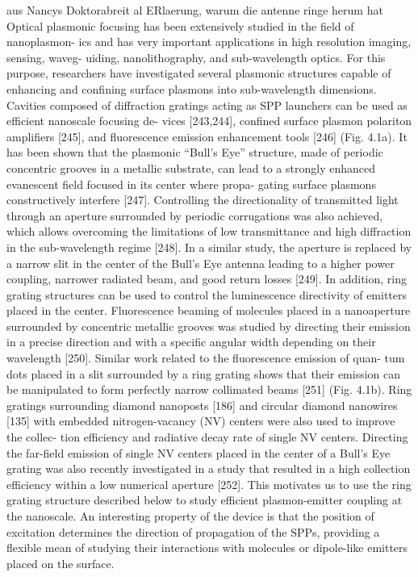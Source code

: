		aus Nancys Doktorabreit al ERlaerung, warum die antenne ringe herum hat
		Optical plasmonic focusing has been extensively studied in the field of nanoplasmon- ics and has very important applications in high resolution imaging, sensing, waveg- uiding, nanolithography, and sub-wavelength optics. For this purpose, researchers have investigated several plasmonic structures capable of enhancing and confining surface plasmons into sub-wavelength dimensions. Cavities composed of diffraction gratings acting as SPP launchers can be used as efficient nanoscale focusing de- vices [243,244], confined surface plasmon polariton amplifiers [245], and fluorescence emission enhancement tools [246] (Fig. 4.1a). It has been shown that the plasmonic “Bull’s Eye” structure, made of periodic concentric grooves in a metallic substrate, can lead to a strongly enhanced evanescent field focused in its center where propa- gating surface plasmons constructively interfere [247]. Controlling the directionality of transmitted light through an aperture surrounded by periodic corrugations was also achieved, which allows overcoming the limitations of low transmittance and high diffraction in the sub-wavelength regime [248]. In a similar study, the aperture is replaced by a narrow slit in the center of the Bull’s Eye antenna leading to a higher power coupling, narrower radiated beam, and good return losses [249]. In addition, ring grating structures can be used to control the luminescence directivity of emitters placed in the center. Fluorescence beaming of molecules placed in a nanoaperture surrounded by concentric metallic grooves was studied by directing their emission in a precise direction and with a specific angular width depending on their wavelength [250]. Similar work related to the fluorescence emission of quan- tum dots placed in a slit surrounded by a ring grating shows that their emission can be manipulated to form perfectly narrow collimated beams [251] (Fig. 4.1b). Ring gratings surrounding diamond nanoposts [186] and circular diamond nanowires [135] with embedded nitrogen-vacancy (NV) centers were also used to improve the collec- tion efficiency and radiative decay rate of single NV centers. Directing the far-field emission of single NV centers placed in the center of a Bull’s Eye grating was also recently investigated in a study that resulted in a high collection efficiency within a low numerical aperture [252]. This motivates us to use the ring grating structure described below to study efficient plasmon-emitter coupling at the nanoscale. An interesting property of the device is that the position of excitation determines the direction of propagation of the SPPs, providing a flexible mean of studying their interactions with molecules or dipole-like emitters placed on the surface.

